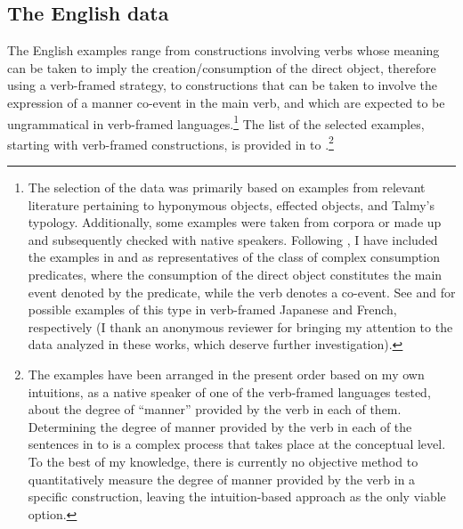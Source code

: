 \documentclass[output=paper,colorlinks,citecolor=brown]{langscibook}
\begin{document}
\subsection{The English data} \label{2.1}

The English examples %
range from constructions involving verbs whose meaning can be taken to imply the creation/consumption of the direct object, therefore using a verb-framed strategy, to constructions that can be taken to involve the expression of a manner co-event in the main verb, and which are expected to be ungrammatical in verb-framed languages.\footnote{The selection of the data was primarily based on examples from relevant literature pertaining to hyponymous objects, effected objects, and Talmy's typology. Additionally, some examples were taken from corpora or made up and subsequently checked with native speakers. %
Following \citet{Mateu2002}, I have included the examples in  and  as representatives of the class of complex consumption predicates, where the consumption of the direct object constitutes the main event denoted by the predicate, while the verb denotes a co-event. See \citet{Kuno1973} and \citet{Condamines2013} for possible examples of this type in verb-framed Japanese and French, respectively (I thank an anonymous reviewer for bringing my attention to the data analyzed in these works, which deserve further investigation).} The list of the selected examples, starting with verb-framed constructions, is provided in  to .\footnote{The examples have been arranged in the present order based on my own intuitions, as a native speaker of one of the verb-framed languages tested, about the degree of ``manner'' provided by the verb in each of them. Determining the degree of manner provided by the verb in each of the sentences in  to  is a complex process that takes place at the conceptual level. %
To the best of my knowledge, there is currently no objective method to quantitatively measure the degree of manner provided by the verb in a specific construction, leaving the intuition-based approach as the only viable option. %
}
\end{document}
